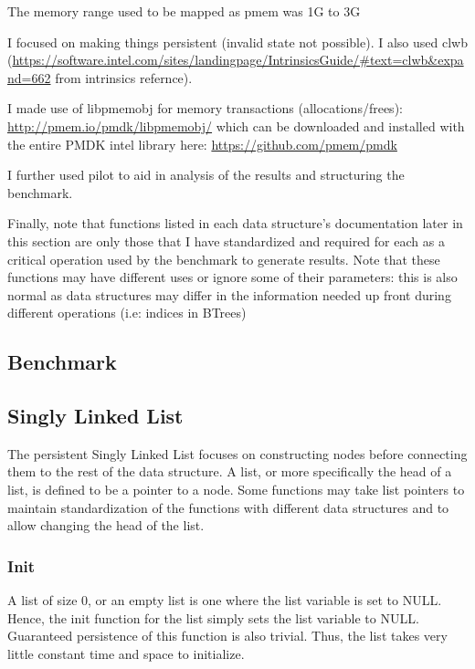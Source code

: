 \documentclass[twocolumn]{article}
\begin{document}
The memory range used to be mapped as pmem was 1G to 3G


I focused on making things persistent (invalid state not possible). I also
used clwb
(\url{https://software.intel.com/sites/landingpage/IntrinsicsGuide/#text=clwb&expand=662}
from intrinsics refernce).

I made use of libpmemobj for memory transactions (allocations/frees):
\url{http://pmem.io/pmdk/libpmemobj/}
which can be downloaded and installed with the entire PMDK intel library here:
\url{https://github.com/pmem/pmdk}

I further used pilot to aid in analysis of the results and structuring the
benchmark.

Finally, note that functions listed in each data structure's documentation later
in this section are only those that I have standardized and required for each as
a critical operation used by the benchmark to generate results. Note that these
functions may have different uses or ignore some of their parameters: this is
also normal as data structures may differ in the information needed up front
during different operations (i.e: indices in BTrees)

\subsection{Benchmark}

\subsection{Singly Linked List}

The persistent Singly Linked List focuses on constructing nodes before
connecting them to the rest of the data structure. A list, or more specifically
the head of a list, is defined to be a pointer to a node. Some functions may
take list pointers to maintain standardization of the functions with different
data structures and to allow changing the head of the list.

\subsubsection{Init}

A list of size 0, or an empty list is one where the list variable is set to
NULL. Hence, the init function for the list simply sets the list variable to
NULL. Guaranteed persistence of this function is also trivial. Thus, the list
takes very little constant time and space to initialize.
\end{document}
